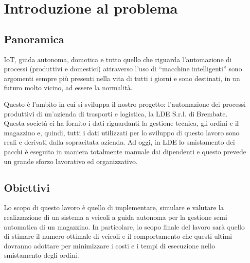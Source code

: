 \documentclass[12pt]{article}
\begin{document}
\begin{titlepage}

\vfill %
\end{titlepage}


\renewcommand{\contentsname}{Contenuti}
\renewcommand\listfigurename{Lista delle figure}
\renewcommand\listtablename{Lista delle tabelle}

\tableofcontents

\newpage

\listoffigures
\listoftables



\newpage 
\section{Introduzione al problema} %
\subsection{Panoramica}
IoT, guida autonoma, domotica e tutto quello che riguarda l’automazione di processi (produttivi e domestici) attraverso l’uso di “macchine intelligenti” sono argomenti sempre più presenti nella vita di tutti i giorni e sono destinati, in un futuro molto vicino, ad essere la normalità.

\noindent Questo è l’ambito in cui si sviluppa il nostro progetto: l’automazione dei processi produttivi di un’azienda di trasporti e logistica, la LDE S.r.l. di Brembate. Questa società ci ha fornito i dati riguardanti la gestione tecnica, gli ordini e il magazzino e, quindi, tutti i dati utilizzati per lo sviluppo di questo lavoro sono reali e derivati dalla sopracitata azienda.
Ad oggi, in LDE lo smistamento dei pacchi è eseguito in maniera totalmente manuale dai dipendenti e questo prevede un grande sforzo lavorativo ed organizzativo.

\subsection{Obiettivi}
Lo scopo di questo lavoro è quello di implementare, simulare e valutare la realizzazione di un sistema a veicoli a guida autonoma per la gestione semi automatica di un magazzino.
In particolare, lo scopo finale del lavoro sarà quello di stimare il numero ottimale di veicoli e il comportamento che questi ultimi dovranno adottare per minimizzare i costi e i tempi di esecuzione nello smistamento degli ordini.
\end{document}
